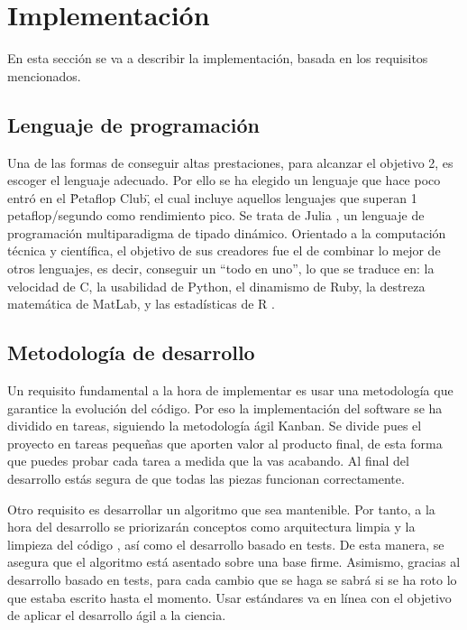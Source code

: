 \chapter{Implementación}
En esta sección se va a describir la implementación, basada en los requisitos mencionados.

\section{Lenguaje de programación}

Una de las formas de conseguir altas prestaciones, para alcanzar el objetivo 2, es escoger el lenguaje adecuado. Por ello se ha elegido
un lenguaje que hace poco entró en el \"Petaflop Club\", el cual incluye aquellos lenguajes que superan 1 petaflop/segundo como rendimiento pico. Se trata
de Julia \cite{julia}, un lenguaje de programación multiparadigma de tipado dinámico. Orientado a la computación técnica y
científica, el objetivo de sus creadores fue el de combinar lo mejor de otros lenguajes, es decir, conseguir un “todo en uno”, lo que se traduce en:
la velocidad de C, la usabilidad de Python, el dinamismo de Ruby, la destreza matemática de MatLab, y las estadísticas de R \cite{julia_goals}.

\section{Metodología de desarrollo}

Un requisito fundamental a la hora de implementar es usar una metodología que garantice la evolución del código. Por eso la implementación 
del software se ha dividido en tareas, siguiendo la metodología ágil Kanban. Se divide pues el proyecto en tareas pequeñas que aporten valor al producto 
final, de esta forma que puedes probar cada tarea a medida que la vas acabando. Al final del desarrollo estás segura de que todas las piezas funcionan
correctamente.

Otro requisito es desarrollar un algoritmo que sea mantenible. Por tanto, a la hora del desarrollo se priorizarán conceptos 
como arquitectura limpia \cite{cleanArquitecture2017} y la limpieza del código \cite{cleanCode2008}, así como el desarrollo basado en tests. De esta manera, se asegura
que el algoritmo está asentado sobre una base firme. Asimismo, gracias al desarrollo basado en tests, para cada cambio que se haga
se sabrá si se ha roto lo que estaba escrito hasta el momento.  Usar estándares va en línea con el objetivo de aplicar el desarrollo ágil a la ciencia.

